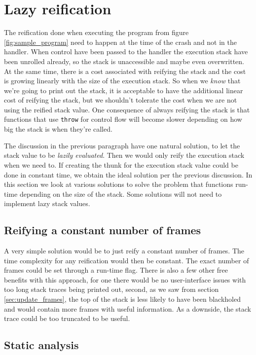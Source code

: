 \section{Lazy reification} \label{sec:lazy_reification}

The reification done when executing the program from figure
\ref{fig:sample_program} need to happen at the time of the crash and
not in the handler. When control have been passed to the handler the
execution stack have been unrolled already, so the stack is unaccessible
and maybe even overwritten. At the same time, there is a cost associated
with reifying the stack and the cost is growing linearly with the size
of the execution stack. So when we \emph{know} that we're going to print
out the stack, it is acceptable to have the additional linear cost of
reifying the stack, but we shouldn't tolerate the cost when we are not
using the reified stack value. One consequence of always reifying the
stack is that functions that use \texttt{throw} for control flow will
become slower depending on how big the stack is when they're called.

The discussion in the previous paragraph have one natural solution, to
let the stack value to be \emph{lazily evaluated}. Then we would only
reify the execution stack when we need to. If creating the thunk for
the execution stack value could be done in constant time, we obtain the
ideal solution per the previous discussion. In this section we look at
various solutions to solve the problem that functions run-time depending
on the size of the stack. Some solutions will not need to implement
lazy stack values.

\subsection{Reifying a constant number of frames}

A very simple solution would be to just reify a constant number of
frames. The time complexity for any reification would then be constant.
The exact number of frames could be set through a run-time flag. There
is also a few other free benefits with this approach, for one there
would be no user-interface issues with too long stack traces being
printed out, second, as we saw from section \ref{sec:update_frames},
the top of the stack is less likely to have been blackholed and would
contain more frames with useful information. As a downside, the stack
trace could be too truncated to be useful.

\subsection{Static analysis}

